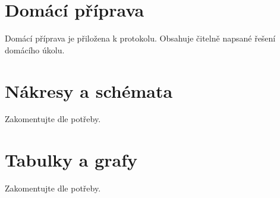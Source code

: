 

%
\section{Domácí příprava}
	Domácí příprava je přiložena k protokolu. Obsahuje čitelně napsané řešení domácího úkolu.
	
\section{Nákresy a schémata}
 Zakomentujte dle potřeby.



\section{Tabulky a grafy}
 Zakomentujte dle potřeby.


 
			
